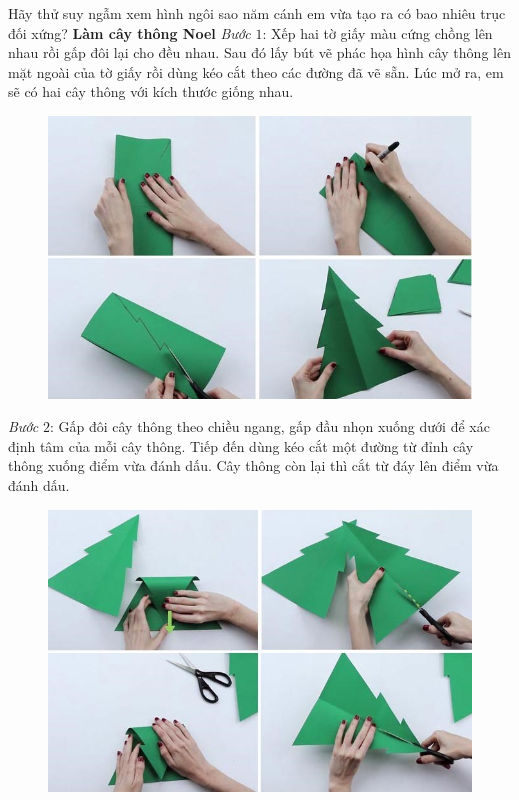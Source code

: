 \begin{multicols}{2}
\begin{figure}[H]
		\vspace*{-5pt}
	\end{figure}
	Hãy thử suy ngẫm xem hình ngôi sao năm cánh em vừa tạo ra có bao nhiêu trục đối xứng?
	\vskip 0.1cm
	\textbf{\color{toancuabi}Làm cây thông Noel}
	\vskip 0.1cm
	\textit{Bước} $1$: Xếp hai tờ giấy màu cứng chồng lên nhau rồi gấp đôi lại cho đều nhau. Sau đó lấy bút vẽ phác họa hình cây thông lên mặt ngoài của tờ giấy rồi dùng kéo cắt theo các đường đã vẽ sẵn. Lúc mở ra, em sẽ có hai cây thông với kích thước giống nhau.
	\begin{figure}[H]
		\vspace*{-5pt}
		\centering
		\captionsetup{labelformat= empty, justification=centering}
		\includegraphics[width= 1\linewidth]{6}
		\vspace*{-15pt}
	\end{figure}
	\textit{Bước} $2$: Gấp đôi cây thông theo chiều ngang, gấp đầu nhọn xuống dưới để xác định tâm của mỗi cây thông. Tiếp đến dùng kéo cắt một đường từ đỉnh cây thông xuống điểm vừa đánh dấu. Cây thông còn lại thì cắt từ đáy lên điểm vừa đánh dấu.
	\begin{figure}[H]
		\vspace*{5pt}
		\centering
		\captionsetup{labelformat= empty, justification=centering}
		\includegraphics[width= 1\linewidth]{7}

\end{figure}
\end{multicols}
